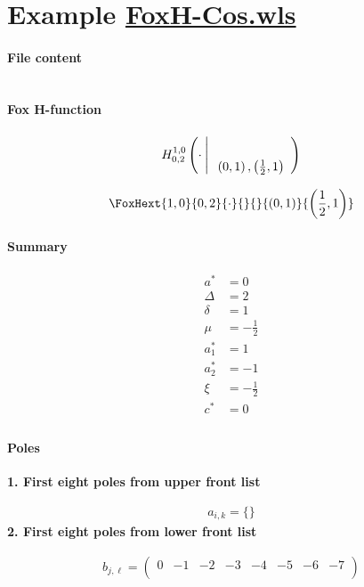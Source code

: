\documentclass[11pt]{article}
\begin{document}
\section{Example \url{FoxH-Cos.wls}}

\paragraph{File content}

\inputminted{text}{FoxH-Cos.wls}

\paragraph{Fox H-function}

\begin{align*}
  \FoxH
    {1,0}
    {0,2}
    {\cdot}
    {}
    {\left(0, 1\right), \left(\frac{1}{2}, 1\right)}
\end{align*}

\begin{align*}
  \FoxHext
    {1,0}
    {0,2}
    {\cdot}
    {}
    {}
    {\left(0, 1\right)}
    {\left(\frac{1}{2}, 1\right)}
\end{align*}

\paragraph{Summary}

\begin{align*}
  a^*    & = 0 \\
  \Delta & = 2 \\
  \delta & = 1 \\
  \mu    & = -\frac{1}{2} \\
  a_1^*  & = 1 \\
  a_2^*  & = -1 \\
  \xi    & = -\frac{1}{2} \\
  c^*    & = 0 \\
\end{align*}

\paragraph{Poles}

\noindent\textbf{1. First eight poles from upper front list}

\begin{align*}
  a_{i,k} = 
  \{\}
\end{align*}
\noindent\textbf{2. First eight poles from lower front list}

\begin{align*}
  b_{j,\ell} = 
  \left(
\begin{array}{cccccccc}
 0 & -1 & -2 & -3 & -4 & -5 & -6 & -7 \\
\end{array}
\right)
\end{align*}

\printbibliography[title={References}]
\end{document}
